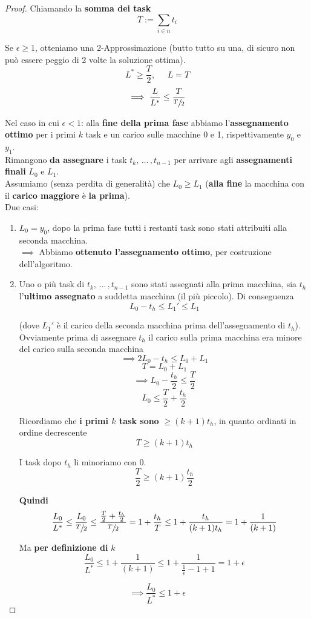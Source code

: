 \begin{proof}
	Chiamando la \textbf{somma dei task}
	$$ T := \sum_{i \in n} t_i$$
	
	Se $\epsilon \geq 1$, otteniamo una 2-Approssimazione (butto tutto su una, di sicuro non può essere peggio di 2 volte la soluzione ottima).
	$$ L^\ast \geq \frac{T}{2}, \;\;\;\;\; L = T $$
	$$\implies \frac{L}{L^\ast} \leq \frac{T}{\sfrac{T}{2}}$$
	
	Nel caso in cui $\epsilon < 1$: alla \textbf{fine della prima fase} abbiamo l'\textbf{assegnamento ottimo} per i primi $k$ task e un carico sulle macchine 0 e 1, rispettivamente $y_0$ e $y_1$. \\
	
	Rimangono \textbf{da assegnare} i task $t_k, \, \dots \, , t_{n-1}$ per arrivare agli \textbf{assegnamenti finali} $L_0$ e $L_1$.\\
	
	Assumiamo (senza perdita di generalità) che $L_0 \geq L_1$ (\textbf{alla fine} la macchina con il \textbf{carico maggiore} è \textbf{la prima}).\\
	
	Due casi: 
	\begin{enumerate}
		\item $L_0 = y_0$, dopo la prima fase tutti i restanti task sono stati attribuiti alla seconda macchina.\\
		$\implies$ Abbiamo \textbf{ottenuto l'assegnamento ottimo}, per costruzione dell'algoritmo.\\
		
		\item Uno o più task di $t_k, \, \dots \, , t_{n-1}$ sono stati assegnati alla prima macchina, sia $t_h$ l'\textbf{ultimo assegnato} a suddetta macchina (il più piccolo). Di conseguenza
		$$ L_0 - t_h \leq L_1' \leq L_1$$
		
		(dove $L_1'$ è il carico della seconda macchina prima dell'assegnamento di $t_h$). Ovviamente prima di assegnare $t_h$ il carico sulla prima macchina era minore del carico sulla seconda macchina
		$$ \implies 2L_0 - t_h \leq L_0 + L_1 $$
		$$ T = L_0 + L_1$$
		$$ \implies L_0 - \frac{t_h}{2} \leq \frac{T}{2} $$
		$$ L_0 \leq \frac{T}{2} + \frac{t_h}{2} $$
		
		Ricordiamo che \textbf{i primi $k$ task sono} $\geq (k+1) t_h$, in quanto ordinati in ordine decrescente
		$$ T \geq (k+1) t_h $$
		
		I task dopo $t_h$ li minoriamo con 0.
		$$ \frac{T}{2} \geq (k+1) \frac{t_h}{2} $$
		
		\textbf{Quindi}
		$$ \frac{L_0}{L^\ast} \leq \frac{L_0}{\sfrac{T}{2}} \leq \frac{\frac{T}{2} + \frac{t_h}{2}}{\sfrac{T}{2}} = 1 + \frac{t_h}{T} \leq 1 + \frac{t_h}{(k+1) t_h} = 1 + \frac{1}{(k+1)} $$
		
		Ma \textbf{per definizione di} $k$ 
		$$ \frac{L_0}{L^\ast} \leq 1 + \frac{1}{(k+1)} \leq 1 + \frac{1}{\frac{1}{\epsilon} - 1 + 1} = 1 + \epsilon $$
	\end{enumerate}
	$$ \implies  \frac{L_0}{L^\ast} \leq 1 + \epsilon $$
\end{proof}

